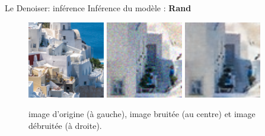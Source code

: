 \documentclass[11pt]{beamer}
\begin{document}
\begin{frame}{Le Denoiser: inférence}
    Inférence du modèle : \textbf{Rand}
    \begin{figure}[b]
        \centering
        \includegraphics[width=0.30\textwidth]{../images/original/0823.png}
        \includegraphics[width=0.30\textwidth]{../images/random_blured/0823.png}
        \includegraphics[width=0.30\textwidth]{../images/random_infer/0823.png}
        \caption{image d'origine (à gauche), image bruitée (au centre) et image débruitée (à droite).}
    \end{figure}
\end{frame}
\end{document}
